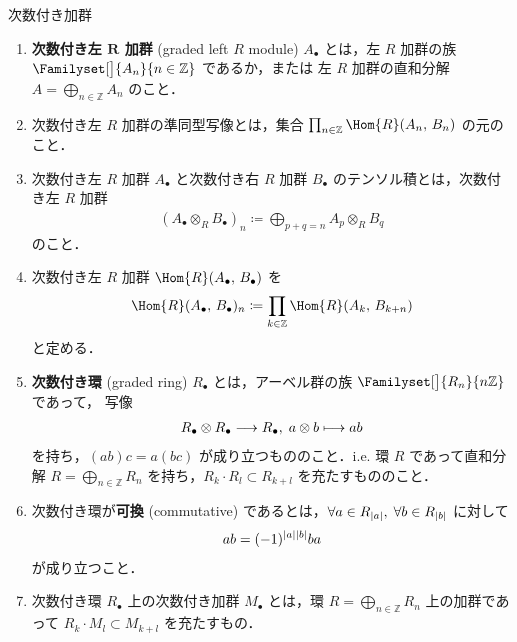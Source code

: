 \documentclass[algtopo_main]{subfiles}
\begin{document}
\begin{mydef}[label=def:graded-mod, breakable]{次数付き加群}
    \begin{enumerate}
        \item \textbf{次数付き左 $\bm{R}$ 加群} (graded left $R$ module) $A_\bullet$ とは，左 $R$ 加群の族 $\Familyset[\big]{A_n}{n \in \mathbb{Z}}$ であるか，または 左 $R$ 加群の直和分解 $A = \bigoplus_{n \in \mathbb{Z}} A_n$ のこと．
        \item 次数付き左 $R$ 加群の準同型写像とは，集合 $\prod_{n \in \mathbb{Z}} \Hom{R} (A_n,\, B_n)$ の元のこと．
        \item 次数付き左 $R$ 加群 $A_\bullet$ と次数付き右 $R$ 加群 $B_\bullet$ のテンソル積とは，次数付き左 $R$ 加群
        \begin{align}
            (A_\bullet \otimes_R B_\bullet)_n \coloneqq \bigoplus_{p+q=n} A_p \otimes_R B_q
        \end{align}
        のこと．
        \item 次数付き左 $R$ 加群 $\Hom{R}(A_\bullet,\, B_\bullet)$ を
        \begin{align}
            \Hom{R} (A_\bullet,\, B_\bullet)_n \coloneqq \prod_{k \in \mathbb{Z}} \Hom{R} (A_k,\, B_{k+n})
        \end{align}
        と定める．
        \item \textbf{次数付き環} (graded ring) $R_\bullet$  とは，アーベル群の族 $\Familyset[\big]{R_n}{n \mathbb{Z}}$ であって，
        写像
        \begin{align}
            R_\bullet \otimes R_\bullet \longrightarrow R_\bullet,\; a \otimes b \longmapsto ab
        \end{align}
        を持ち，$(ab)c = a(bc)$ が成り立つもののこと．i.e. 環 $R$ であって直和分解 $R = \bigoplus_{n \in \mathbb{Z}} R_n$ を持ち，$R_k \cdot R_l \subset R_{k+l}$ を充たすもののこと．
        \item 次数付き環が\textbf{可換} (commutative) であるとは，$\forall a \in R_{\abs{a}},\; \forall b \in R_{\abs{b}}$ に対して
        \begin{align}
            ab = (-1)^{\abs{a}\abs{b}} ba
        \end{align}
        が成り立つこと．
        \item 次数付き環 $R_\bullet$ 上の次数付き加群 $M_\bullet$ とは，環 $R = \bigoplus_{n \in \mathbb{Z}} R_n$ 上の加群であって $R_k \cdot M_l \subset M_{k+l}$ を充たすもの．
    \end{enumerate}
\end{mydef}
\end{document}
